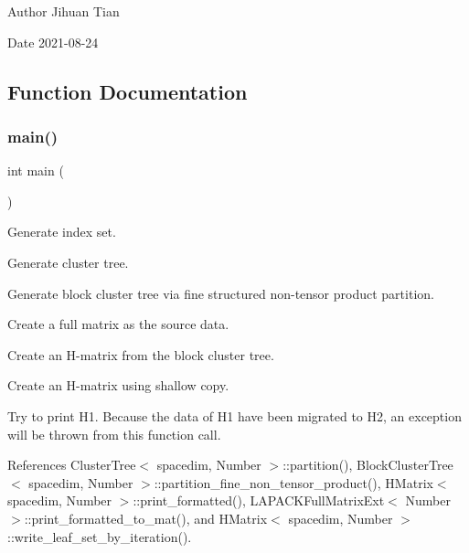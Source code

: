 \begin{DoxyAuthor}{Author}
Jihuan Tian 
\end{DoxyAuthor}
\begin{DoxyDate}{Date}
2021-\/08-\/24 
\end{DoxyDate}


\subsection{Function Documentation}
\mbox{\label{hmatrix-shallow-copy-constructor_8cc_ae66f6b31b5ad750f1fe042a706a4e3d4}} 
\subsubsection{\texorpdfstring{main()}{main()}}
{\footnotesize\ttfamily int main (\begin{DoxyParamCaption}{ }\end{DoxyParamCaption})}

Generate index set.

Generate cluster tree.

Generate block cluster tree via fine structured non-\/tensor product partition.

Create a full matrix as the source data.

Create an H-\/matrix from the block cluster tree.

Create an H-\/matrix using shallow copy.

Try to print H1. Because the data of H1 have been migrated to H2, an exception will be thrown from this function call.

References Cluster\+Tree$<$ spacedim, Number $>$\+::partition(), Block\+Cluster\+Tree$<$ spacedim, Number $>$\+::partition\+\_\+fine\+\_\+non\+\_\+tensor\+\_\+product(), H\+Matrix$<$ spacedim, Number $>$\+::print\+\_\+formatted(), L\+A\+P\+A\+C\+K\+Full\+Matrix\+Ext$<$ Number $>$\+::print\+\_\+formatted\+\_\+to\+\_\+mat(), and H\+Matrix$<$ spacedim, Number $>$\+::write\+\_\+leaf\+\_\+set\+\_\+by\+\_\+iteration().

